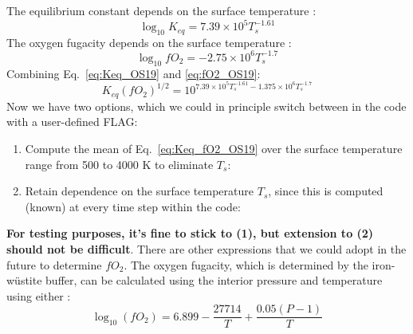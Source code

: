 The equilibrium constant depends on the surface temperature \citep[Eq.~41,][]{OS19}:
\begin{equation}
    \log_{10} K_{eq} = 7.39\times 10^5T_s^{-1.61}
    \label{eq:Keq_OS19}
\end{equation}
The oxygen fugacity depends on the surface temperature \citep[Eq.~40,][]{OS19}:
\begin{equation}
\log_{10} fO_2 = -2.75 \times 10^6 T_s^{-1.7}
\label{eq:fO2_OS19}
\end{equation}
Combining Eq.~\ref{eq:Keq_OS19} and \ref{eq:fO2_OS19}:
\begin{equation}
K_{eq} (fO_2)^{1/2} = 10^{7.39 \times 10^5 T_s^{-1.61}-1.375 \times 10^6 T_s^{-1.7}}
\label{eq:Keq_fO2_OS19}
\end{equation}
Now we have two options, which we could in principle switch between in the code with a user-defined FLAG:
\begin{enumerate}
\item Compute the mean of Eq.~\ref{eq:Keq_fO2_OS19} over the surface temperature range from 500 to 4000 K to eliminate $T_s$:
\item Retain dependence on the surface temperature $T_s$, since this is computed (known) at every time step within the code:
\end{enumerate}
\textbf{For testing purposes, it's fine to stick to (1), but extension to (2) should not be difficult}.  There are other expressions that we could adopt in the future to determine $fO_2$.  The oxygen fugacity, which is determined by the iron-w\"{u}stite buffer, can be calculated using the interior pressure and temperature using either \citep{O87}: 
\begin{equation}
    \log_{10}\left(fO_2\right) = 6.899 - \frac{27714}{T} + \frac{0.05(P-1)}{T}
\end{equation}
